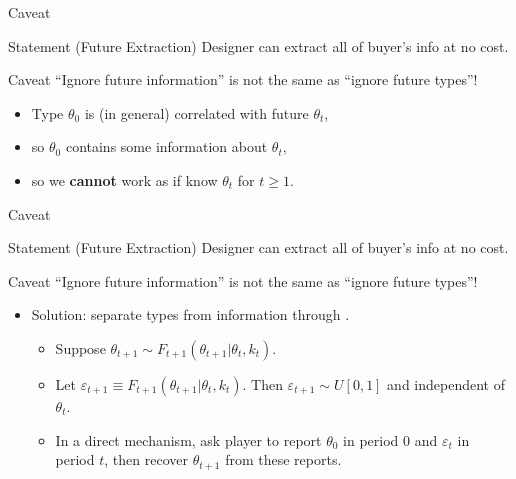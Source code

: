 \documentclass[english,10pt
,aspectratio=169
]{beamer}
\begin{document}
\begin{frame}{Caveat}
	\begin{block}{Statement (Future Extraction)}
		Designer can extract all of buyer's  info at no cost.
	\end{block}
	\begin{minipage}[c][0.55\textheight][s]{\textwidth}
		\begin{alertblock}{Caveat}
			``Ignore future information'' is not the same as ``ignore future types''!
		\end{alertblock}
		\begin{itemize}
			\item Type $\theta_0$ is (in general) correlated with future $\theta_t$,
			\item so $\theta_0$ contains some information about $\theta_t$,
			\item so we \textbf{cannot} work as if know $\theta_t$ for $t \geq 1$.
		\end{itemize}
	\end{minipage}
\end{frame}


\begin{frame}{Caveat}
	\begin{block}{Statement (Future Extraction)}
		Designer can extract all of buyer's  info at no cost.
	\end{block}
	\begin{minipage}[c][0.55\textheight][s]{\textwidth}
		\begin{alertblock}{Caveat}
			``Ignore future information'' is not the same as ``ignore future types''!
		\end{alertblock}
		\begin{itemize}
			\item Solution: separate \alert{types} from \alert{information} through .
			\begin{itemize}
				\item Suppose $\theta_{t+1} \sim F_{t+1} (\theta_{t+1} | \theta_t, k_t)$.
				\item Let $\varepsilon_{t+1} \equiv F_{t+1} (\theta_{t+1} | \theta_t, k_t)$. Then $\varepsilon_{t+1} \sim U[0,1]$ and independent of $\theta_t$.
				\item In a direct mechanism, ask player to report $\theta_0$ in period $0$ and $\varepsilon_{t}$ in period $t$, then recover $\theta_{t+1}$ from these reports.
			\end{itemize}
		\end{itemize}
	\end{minipage}
\end{frame}
\end{document}
